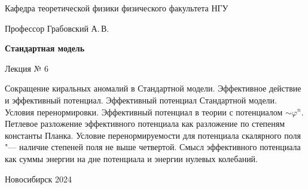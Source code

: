 \documentclass[12pt,pagesize,paper=192mm:108mm,landscape]{scrbook}
\begin{document}
\begin{titlepage}
\begin{center}
    Кафедра теоретической физики физического факультета НГУ
    \medskip

    \Large
    Профессор Грабовский А.\,В.
    \smallskip

    \huge
    \textbf{Стандартная модель}
    \smallskip

    \Large
    Лекция № 6
    \vfill

    \normalsize
    \begin{minipage}{0.85\linewidth}
      Сокращение киральных аномалий в Стандартной модели.     
      Эффективное действие и эффективный потенциал. Эффективный
      потенциал Стандартной модели. Условия
      перенормировки. Эффективный потенциал в теории с потенциалом
      $\sim\varphi^n$. Петлевое разложение эффективного потенциала как разложение
      по степеням константы Планка. Условие перенормируемости для
      потенциала скалярного поля "--- наличие степеней поля не выше
      четвертой. Смысл эффективного потенциала как суммы энергии на
      дне потенциала и энергии нулевых колебаний.
    \end{minipage}
    \vfill

    \normalsize \ccbysa\hspace{0.5em}  Новосибирск 2024
  \end{center}
\end{titlepage}
\end{document}
